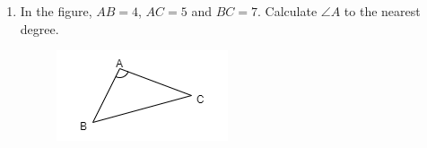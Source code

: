 \documentclass[11pt]{article}
\begin{document}
\begin{enumerate}
        \hrulefill

        \hrulefill

        \hrulefill
            
        \hrulefill
        
        \hrulefill
        
        \hrulefill
        
        \hrulefill
        
        \hrulefill
        
        \hrulefill
        
        \hrulefill
        
        \hrulefill
        
        \hrulefill
        
        \hrulefill

        \hrulefill

        \hrulefill
            
        \hrulefill
        
        \hrulefill
        
        \hrulefill
        
        \hrulefill
        
        \hrulefill
        
        \hrulefill
        
        \hrulefill
        
        \hrulefill
        
        \hrulefill
        
        \hrulefill
            
        \hrulefill
        
        \hrulefill
        
        \hrulefill
        
        \hrulefill
        
        \hrulefill
        
        \hrulefill
        
        \hrulefill
        
        \hrulefill
        
        \hrulefill
        
        \hrulefill

    \pagebreak
    \item In the figure, $AB=4$, $AC=5$ and $BC=7$. Calculate $\angle A$ to the nearest degree.\begin{figure}[H]
        \centering
        \includegraphics[scale=0.8]{f4finalq38.png}
    \end{figure}


\end{enumerate}
\end{document}
